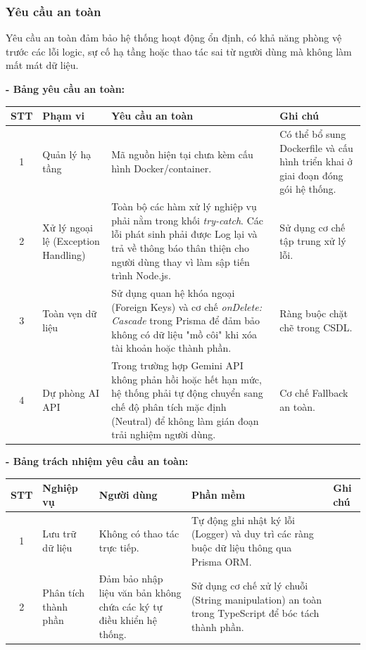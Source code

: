 \documentclass[12pt,a4paper]{article}
\begin{document}
\subsubsection{Yêu cầu an toàn}
Yêu cầu an toàn đảm bảo hệ thống hoạt động ổn định, có khả năng phòng vệ trước các lỗi logic, sự cố hạ tầng hoặc thao tác sai từ người dùng mà không làm mất mát dữ liệu.

\textbf{- Bảng yêu cầu an toàn:}

\begin{center}
\begin{tabular}{|c|p{3.5cm}|p{5.3cm}|p{3.5cm}|}
\hline
\textbf{STT} & \textbf{Phạm vi} & \textbf{Yêu cầu an toàn} & \textbf{Ghi chú} \\
\hline
1 & Quản lý hạ tầng & Mã nguồn hiện tại chưa kèm cấu hình Docker/container. & Có thể bổ sung Dockerfile và cấu hình triển khai ở giai đoạn đóng gói hệ thống. \\
\hline
2 & Xử lý ngoại lệ (Exception Handling) & Toàn bộ các hàm xử lý nghiệp vụ phải nằm trong khối \textit{try-catch}. Các lỗi phát sinh phải được Log lại và trả về thông báo thân thiện cho người dùng thay vì làm sập tiến trình Node.js. & Sử dụng cơ chế tập trung xử lý lỗi. \\
\hline
3 & Toàn vẹn dữ liệu & Sử dụng quan hệ khóa ngoại (Foreign Keys) và cơ chế \textit{onDelete: Cascade} trong Prisma để đảm bảo không có dữ liệu "mồ côi" khi xóa tài khoản hoặc thành phần. & Ràng buộc chặt chẽ trong CSDL. \\
\hline
4 & Dự phòng AI API & Trong trường hợp Gemini API không phản hồi hoặc hết hạn mức, hệ thống phải tự động chuyển sang chế độ phân tích mặc định (Neutral) để không làm gián đoạn trải nghiệm người dùng. & Cơ chế Fallback an toàn. \\
\hline
\end{tabular}
\end{center}

\textbf{- Bảng trách nhiệm yêu cầu an toàn:}

\begin{center}
\begin{tabular}{|c|p{3cm}|p{3.5cm}|p{4.5cm}|p{2cm}|}
\hline
\textbf{STT} & \textbf{Nghiệp vụ} & \textbf{Người dùng} & \textbf{Phần mềm} & \textbf{Ghi chú} \\
\hline
1 & Lưu trữ dữ liệu & Không có thao tác trực tiếp. & Tự động ghi nhật ký lỗi (Logger) và duy trì các ràng buộc dữ liệu thông qua Prisma ORM. & \\
\hline
2 & Phân tích thành phần & Đảm bảo nhập liệu văn bản không chứa các ký tự điều khiển hệ thống. & Sử dụng cơ chế xử lý chuỗi (String manipulation) an toàn trong TypeScript để bóc tách thành phần. & \\
\hline
\end{tabular}
\end{center}
\end{document}
